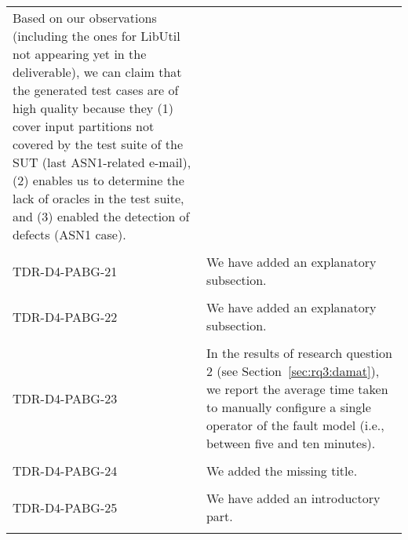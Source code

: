 \begin{longtable}{|p{2cm}|p{12cm}|@{}}
\begin{minipage}{12cm}
Based on our observations (including the ones for LibUtil not appearing yet in the deliverable), we can claim that the generated test cases are of high quality because they (1) cover input partitions not covered by the test suite of the SUT (last ASN1-related e-mail), (2) enables us to determine  the lack of oracles in the test suite, and (3) enabled the detection of defects (ASN1 case).
\end{minipage}\\
\\
\hline
TDR-D4-PABG-21&
\begin{minipage}{12cm}
We have added an explanatory subsection.
\end{minipage}\\
\\
\hline
TDR-D4-PABG-22&
\begin{minipage}{12cm}
We have added an explanatory subsection.
\end{minipage}\\
\\
\hline
TDR-D4-PABG-23&
\begin{minipage}{12cm}
In the results of research question 2 (see Section~\ref{sec:rq3:damat}), we report the average time taken to manually configure a single operator of the fault model (i.e., between five and ten minutes).
\end{minipage}\\
\\
\hline
TDR-D4-PABG-24&
\begin{minipage}{12cm}
We added the missing title.
\end{minipage}\\
\\
\hline
TDR-D4-PABG-25&
\begin{minipage}{12cm}
We have added an introductory part.
\end{minipage}\\
\\
\hline
\end{longtable}
\normalsize

\clearpage
